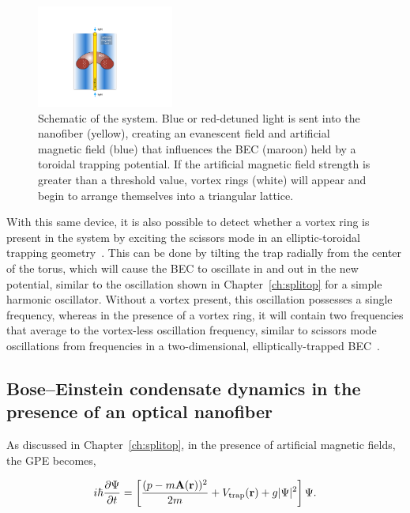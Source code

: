 \begin{figure}[t]
\begin{center}
\includegraphics[width=0.4\textwidth]{data/3d/Schematic_TB}
\end{center}
\caption{Schematic of the system. Blue or red-detuned light is sent into the nanofiber (yellow), creating an evanescent field and artificial magnetic field (blue) that influences the BEC (maroon) held by a toroidal trapping potential. If the artificial magnetic field strength is greater than a threshold value, vortex rings (white) will appear and begin to arrange themselves into a triangular lattice.}
\label{fig:device}
\end{figure}

With this same device, it is also possible to detect whether a vortex ring is present in the system by exciting the scissors mode in an elliptic-toroidal trapping geometry~\cite{cozzini2003, guery1999, marago2000}.
This can be done by tilting the trap radially from the center of the torus, which will cause the BEC to oscillate in and out in the new potential, similar to the oscillation shown in Chapter~\ref{ch:splitop} for a simple harmonic oscillator.
Without a vortex present, this oscillation possesses a single frequency, whereas in the presence of a vortex ring, it will contain two frequencies that average to the vortex-less oscillation frequency, similar to scissors mode oscillations from frequencies in a two-dimensional, elliptically-trapped BEC~\cite{smith2004, zambelli1998, stringari2001}.

\subsection{Bose--Einstein condensate dynamics in the presence of an optical nanofiber}

As discussed in Chapter~\ref{ch:splitop}, in the presence of artificial magnetic fields, the GPE becomes,

\begin{equation}
i\hbar \frac{\partial \Psi}{\partial t} = \left[\frac{(p-m\mathbf{A}({\bf r}))^2}{2m} + V_{\text{trap}}({\bf r}) + g|\Psi|^2 \right] \Psi.
\end{equation}

